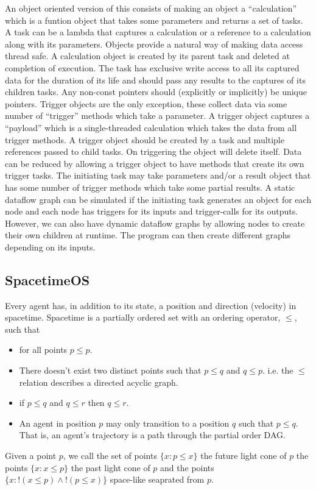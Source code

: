 \documentclass[a4paper]{article}
\begin{document}
An object oriented version of this consists of making an object a ``calculation'' which is a funtion object that takes some parameters and returns a set of tasks. A task can be a lambda that captures a calculation or a reference to a calculation along with its parameters. Objects provide a natural way of making data access thread safe. A calculation object is created by its parent task and deleted at completion of execution. The task has exclusive write access to all its captured data for the duration of its life and should pass any results to the captures of its children tasks. Any non-const pointers should (explicitly or implicitly) be unique pointers. Trigger objects are the only exception, these collect data via some number of ``trigger'' methods which take a parameter. A trigger object captures a ``payload'' which is a single-threaded calculation which takes the data from all trigger methods.   A trigger object should be created by a task and multiple references passed to child tasks. On triggering the object will delete itself. Data can be reduced by allowing a trigger object to have methods that create its own trigger tasks.  The initiating task may take parameters and/or a result object that has some number of trigger methods which take some partial results. A static dataflow graph can be simulated if the initiating task generates an object for each node and each node has triggers for its inputs and trigger-calls for its outputs. However, we can also have dynamic dataflow graphs by allowing nodes to create their own children at runtime. The program can then create different graphs depending on its inputs.

\subsection{SpacetimeOS}

Every agent has, in addition to its state, a position and direction (velocity) in spacetime. Spacetime is a partially ordered set with an ordering operator, $\le$, such that
\begin{itemize}
	\item for all points $p \le p$.
	
	\item There doesn't exist two distinct points such that $p \le q$ and $q \le p$. i.e. the $\le$ relation describes a directed acyclic graph.
	
	\item if $p \le q$ and $q \le r$ then $q \le r$.
	
	\item An agent in position $p$ may only transition to a position $q$ such that $p \le q$. That is, an agent's trajectory is a path through the partial order DAG.
	
\end{itemize}
Given a point $p$, we call the set of points $\{x : p \le x\}$ the future light cone of $p$ the points $\{x : x \le p\}$ the past light cone of $p$ and the points $\{x : !(x \le p) \wedge !(p \le x)\}$ space-like seaprated from $p$.
\end{document}
